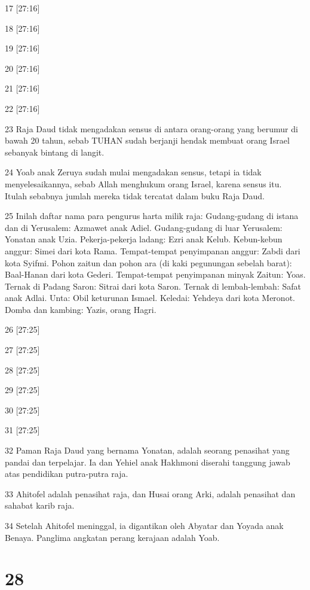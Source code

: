 \par 17 [27:16]
\par 18 [27:16]
\par 19 [27:16]
\par 20 [27:16]
\par 21 [27:16]
\par 22 [27:16]
\par 23 Raja Daud tidak mengadakan sensus di antara orang-orang yang berumur di bawah 20 tahun, sebab TUHAN sudah berjanji hendak membuat orang Israel sebanyak bintang di langit.
\par 24 Yoab anak Zeruya sudah mulai mengadakan sensus, tetapi ia tidak menyelesaikannya, sebab Allah menghukum orang Israel, karena sensus itu. Itulah sebabnya jumlah mereka tidak tercatat dalam buku Raja Daud.
\par 25 Inilah daftar nama para pengurus harta milik raja: Gudang-gudang di istana dan di Yerusalem: Azmawet anak Adiel. Gudang-gudang di luar Yerusalem: Yonatan anak Uzia. Pekerja-pekerja ladang: Ezri anak Kelub. Kebun-kebun anggur: Simei dari kota Rama. Tempat-tempat penyimpanan anggur: Zabdi dari kota Syifmi. Pohon zaitun dan pohon ara (di kaki pegunungan sebelah barat): Baal-Hanan dari kota Gederi. Tempat-tempat penyimpanan minyak Zaitun: Yoas. Ternak di Padang Saron: Sitrai dari kota Saron. Ternak di lembah-lembah: Safat anak Adlai. Unta: Obil keturunan Ismael. Keledai: Yehdeya dari kota Meronot. Domba dan kambing: Yazis, orang Hagri.
\par 26 [27:25]
\par 27 [27:25]
\par 28 [27:25]
\par 29 [27:25]
\par 30 [27:25]
\par 31 [27:25]
\par 32 Paman Raja Daud yang bernama Yonatan, adalah seorang penasihat yang pandai dan terpelajar. Ia dan Yehiel anak Hakhmoni diserahi tanggung jawab atas pendidikan putra-putra raja.
\par 33 Ahitofel adalah penasihat raja, dan Husai orang Arki, adalah penasihat dan sahabat karib raja.
\par 34 Setelah Ahitofel meninggal, ia digantikan oleh Abyatar dan Yoyada anak Benaya. Panglima angkatan perang kerajaan adalah Yoab.

\chapter{28}

